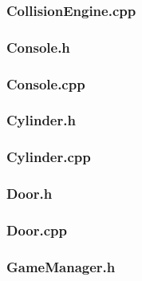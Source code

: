 \documentclass{article}
\begin{document}
\subsubsection{CollisionEngine.cpp}
	
					
\subsubsection{Console.h}
	
					
\subsubsection{Console.cpp}
	
					
\subsubsection{Cylinder.h}
	
					
\subsubsection{Cylinder.cpp}
	
					
\subsubsection{Door.h}
	

\subsubsection{Door.cpp}
	
 				
\subsubsection{GameManager.h}
	
\end{document}
